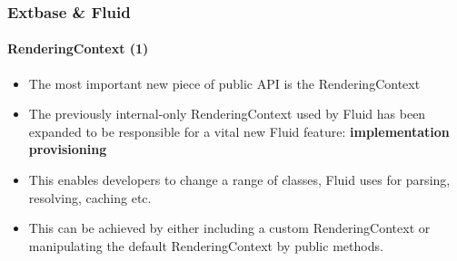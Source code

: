 
\begin{frame}[fragile]
	\frametitle{Extbase \& Fluid}
	\framesubtitle{RenderingContext (1)}

	\lstset{basicstyle=\tiny\ttfamily}

	\begin{itemize}

		\item The most important new piece of public API is the RenderingContext

		\item The previously internal-only RenderingContext used by Fluid has been
			expanded to be responsible for a vital new Fluid feature:
			\textbf{implementation provisioning}

		\item This enables developers to change a range of classes, Fluid uses for
			parsing, resolving, caching etc.

		\item This can be achieved by either including a custom RenderingContext or
			manipulating the default RenderingContext by public methods.

	\end{itemize}

\end{frame}


